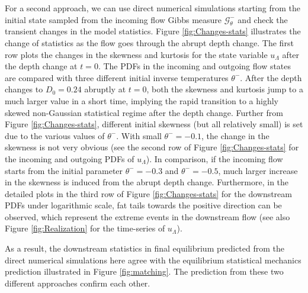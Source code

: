 \documentclass[9pt,twocolumn,twoside,lineno]{pnas-new}
\begin{document}
For a second approach, we can use direct numerical simulations starting
from the initial state sampled from the incoming flow Gibbs measure
$\mathcal{G}_{\theta}^{-}$ and check the transient changes in the
model statistics. Figure \ref{fig:Changes-stats} illustrates the
change of statistics as the flow goes through the abrupt depth change.
The first row plots the changes in the skewness and kurtosis for the
state variable $u_{\Lambda}$ after the depth change at $t=0$. The
PDFs in the incoming and outgoing flow states are compared with three different
initial inverse temperatures $\theta^{-}$. After the depth changes
to $D_{0}=0.24$ abruptly at $t=0$, both the skewness and kurtosis
jump to a much larger value in a short time, implying the rapid transition
to a highly skewed non-Gaussian statistical regime after the depth
change. Further from Figure \ref{fig:Changes-stats}, different initial
skewness (but all relatively small) is set due to the various values
of $\theta^{-}$. With small $\theta^{-}=-0.1$, the change in the
skewness is not very obvious (see the second row of Figure \ref{fig:Changes-stats}
for the incoming and outgoing PDFs of $u_{\Lambda}$). In comparison,
if the incoming flow starts from the initial parameter $\theta^{-}=-0.3$
and $\theta^{-}=-0.5$, much larger increase in the skewness is induced
from the abrupt depth change. Furthermore, in the detailed plots in
the third row of Figure \ref{fig:Changes-stats} for the downstream PDFs
under logarithmic scale, fat tails towards the positive direction
can be observed, which represent the extreme events in the downstream
flow (see also Figure \ref{fig:Realization} for the time-series of
$u_{\Lambda}$).

As a result, the downstream statistics in final equilibrium predicted
from the direct numerical simulations here agree with the equilibrium
statistical mechanics prediction illustrated in Figure \ref{fig:matching}. The prediction from these two different approaches
confirm each other.
\end{document}
